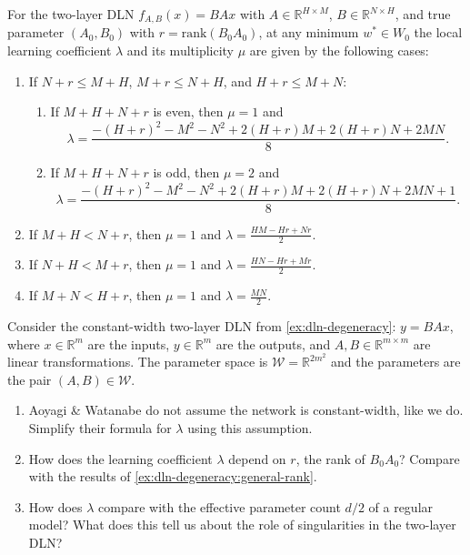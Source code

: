 \documentclass[11pt]{article}
\newcommand{\R}{\mathbb{R}}
\newcommand{\rank}{\mathrm{rank}}
\newcommand{\W}{\mathcal{W}}
\begin{document}
\begin{theorem}
\label{thm:aoyagi-watanabe}
    For the two-layer DLN $f_{A,B}(x) = BAx$ with
    $A \in \R^{H \times M}$, $B \in \R^{N \times H}$, and true parameter
    $(A_0, B_0)$ with $r = \rank(B_0 A_0)$, at any minimum $w^* \in W_0$ the local learning coefficient $\lambda$ and its multiplicity $\mu$ are given by the following cases:
    \begin{enumerate}
        \item If $N + r \leq M + H$, \; $M + r \leq N + H$, \; and \; $H + r \leq M + N$:
        \begin{enumerate}
            \item If $M + H + N + r$ is even, then $\mu = 1$ and
            \[
                \lambda = \frac{-(H+r)^2 - M^2 - N^2 + 2(H+r)M + 2(H+r)N + 2MN}{8}.
            \]
            \item If $M + H + N + r$ is odd, then $\mu = 2$ and
            \[
                \lambda = \frac{-(H+r)^2 - M^2 - N^2 + 2(H+r)M + 2(H+r)N + 2MN + 1}{8}.
            \]
        \end{enumerate}
        \item If $M + H < N + r$, then $\mu = 1$ and
        $\displaystyle\lambda = \frac{HM - Hr + Nr}{2}$.
        \item If $N + H < M + r$, then $\mu = 1$ and
        $\displaystyle\lambda = \frac{HN - Hr + Mr}{2}$.
        \item If $M + N < H + r$, then $\mu = 1$ and
        $\displaystyle\lambda = \frac{MN}{2}$.
    \end{enumerate}
\end{theorem}

\begin{exercise}
\label{ex:dln-lc}
    Consider the constant-width two-layer DLN from \cref{ex:dln-degeneracy}: $y = BAx$, where $x \in \R^m$ are the inputs, $y \in \R^m$ are the outputs, and $A, B \in \R^{m \times m}$ are linear transformations. The parameter space is $\W = \R^{2m^2}$ and the parameters are the pair $(A, B) \in \W$.
    \begin{enumerate}
        \item Aoyagi \& Watanabe do not assume the network is constant-width, like we do. Simplify their formula for $\lambda$ using this assumption.
        \item How does the learning coefficient $\lambda$ depend on $r$, the rank of $B_0 A_0$? Compare with the results of \cref{ex:dln-degeneracy:general-rank}.
        \item How does $\lambda$ compare with the effective parameter count $d/2$ of a regular model? What does this tell us about the role of singularities in the two-layer DLN?
\end{enumerate}
\end{exercise}
\end{document}

